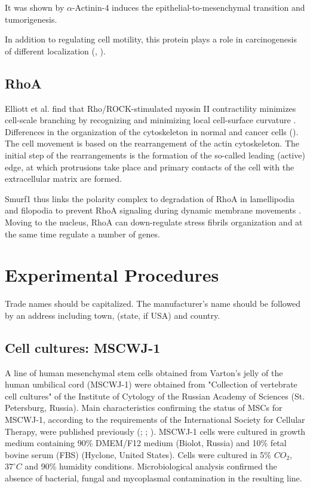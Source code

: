 \documentclass[alpha-refs]{wiley-article}
\begin{document}
It was shown by \cite{an2016alpha} $\alpha$-Actinin-4 induces the epithelial-to-mesenchymal transition and tumorigenesis.

In addition to regulating cell motility, this protein plays a role in carcinogenesis of different localization (\cite{barbolina2008motility}, \cite{hsu2013alpha}).

\subsection*{RhoA}

 Elliott et al. find that Rho/ROCK-stimulated myosin II contractility minimizes cell-scale branching by recognizing and minimizing local cell-surface curvature \cite{elliott2015myosin}.
 Differences in the organization of the cytoskeleton in normal and cancer cells (\cite{shutova2010normal}).
 The cell movement is based on the rearrangement of the actin cytoskeleton. The initial step of the rearrangements is the formation of the so-called leading (active) edge, at which protrusions take place and primary contacts of the cell with the extracellular matrix are formed.

 Smurf1 thus links the polarity complex to degradation of RhoA in lamellipodia and filopodia to prevent RhoA signaling during dynamic membrane movements \cite{wang2003regulation}.
 Moving to the nucleus, RhoA can down-regulate stress fibrils organization and at the same time regulate a number of genes.


\section{Experimental Procedures}

Trade names should be capitalized. The manufacturer's name should be followed by an address including town, (state, if USA) and country.

\subsection{Cell cultures: MSCWJ-1}

A line of human mesenchymal stem cells obtained from Varton's jelly of the human umbilical cord (MSCWJ-1) were obtained from "Collection of vertebrate cell cultures" of the Institute of Cytology of the Russian Academy of Sciences (St. Petersburg, Russia).
Main characteristics confirming the status of MSCs for MSCWJ-1, according to the requirements of the International Society for Cellular Therapy, were published previously (\cite{dominici2006minimal}; \cite{sensebe2010mesenchymal}; \cite{krylova2017derivation}).
MSCWJ-1 cells were cultured in growth medium containing 90\% DMEM/F12 medium (Biolot, Russia) and 10\% fetal bovine serum (FBS) (Hyclone, United States).
Cells were cultured in 5\% $CO_2$, $37^{\circ}  C$ and 90\% humidity conditions.
Microbiological analysis confirmed the absence of bacterial, fungal and mycoplasmal contamination in the resulting line.
\end{document}

